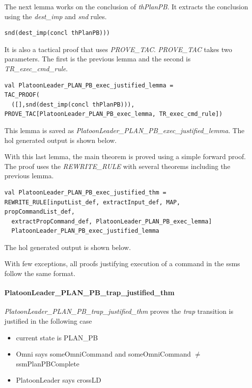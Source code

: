 \documentclass[../../main/main.tex]{subfiles}
\begin{document}
The next lemma works on the conclusion of \textit{thPlanPB}.  It extracts the conclusion using the \textit{dest_imp} and \textit{snd} rules. 

\begin{lstlisting}
snd(dest_imp(concl thPlanPB)))
\end{lstlisting}

 It is also a tactical proof that uses \textit{PROVE_TAC}.  \textit{PROVE_TAC} takes two parameters. The first is the previous lemma and the second is \textit{TR_exec_cmd_rule}.  

\begin{lstlisting}
val PlatoonLeader_PLAN_PB_exec_justified_lemma =
TAC_PROOF(
  ([],snd(dest_imp(concl thPlanPB))),
PROVE_TAC[PlatoonLeader_PLAN_PB_exec_lemma, TR_exec_cmd_rule])
\end{lstlisting}

This lemma is saved as \textit{PlatoonLeader_PLAN_PB_exec_justified_lemma}.  The \gls{hol} generated output is shown below.

\HOLssmPBIntegratedTheoremsPlatoonLeaderXXPLANXXPBXXexecXXjustifiedXXlemma


With this last lemma, the main theorem is proved using a simple forward proof.  The proof uses the \textit{REWRITE_RULE} with several theorems including the previous lemma. 

\begin{lstlisting}
val PlatoonLeader_PLAN_PB_exec_justified_thm =
REWRITE_RULE[inputList_def, extractInput_def, MAP, propCommandList_def,
  extractPropCommand_def, PlatoonLeader_PLAN_PB_exec_lemma]
  PlatoonLeader_PLAN_PB_exec_justified_lemma
\end{lstlisting}

The \gls{hol} generated output is shown below.
\HOLssmPBIntegratedTheoremsPlatoonLeaderXXPLANXXPBXXexecXXjustifiedXXthm

With few exceptions, all proofs justifying execution of a command in the \glspl{ssm} follow the same format.

\paragraph*{PlatoonLeader_PLAN_PB_trap_justified_thm}
\textit{PlatoonLeader_PLAN_PB_trap_justified_thm} proves the \textit{trap} transition is justified in the following case
\begin{itemize}
\item current state is PLAN_PB
\item Omni says someOmniCommand and someOmniCommand $\neq$ ssmPlanPBComplete
\item PlatoonLeader says crossLD
\end{itemize}
\end{document}
